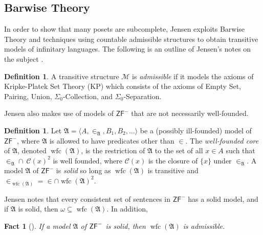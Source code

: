 \documentclass{amsart}
\newtheorem{fact}[theorem]{Fact}
\theoremstyle{definition}
\newtheorem{definition}[theorem]{Definition}
\theoremstyle{remark}
\newcommand{\M}{\mathcal{M}}
\DeclareMathOperator{\wfc}{wfc}
\begin{document}
\subsection{Barwise Theory}
\label{subsec:BarwiseTheory}
In order to show that many posets are subcomplete, Jensen exploits Barwise Theory and techniques using countable admissible structures to obtain transitive models of infinitary languages.  The following is an outline of Jensen's notes on the subject \cite[Ch.~1 \& 2]{Jensen:2014}. 

\begin{definition} A transitive structure $\M$ is \emph{admissible} if it models the axioms of \textsf{Kripke-Platek Set Theory} (\textsf{KP}) which consists of the axioms of \textsf{Empty Set}, \textsf{Pairing}, \textsf{Union}, $\Sigma_0$-\textsf{Collection}, and $\Sigma_0$-\textsf{Separation}. \end{definition}

Jensen also makes use of models of $\textsf{ZF}^-$ that are not necessarily well-founded.
\begin{definition} Let $\mathfrak A = \langle A, \in_{\mathfrak A}, B_1, B_2, \dots \rangle$ be a (possibly ill-founded) model  of $\textsf{ZF}^-$, where $\mathfrak A$ is allowed to have predicates other than $\in$. The \emph{well-founded core} of $\mathfrak A$, denoted $\wfc(\mathfrak A)$, is the restriction of $\mathfrak A$ to the set of all $x \in A$ such that $\in_{\mathfrak A} \cap \ \mathcal C(x)^2$ is well founded, where $\mathcal C(x)$ is the closure of $\{x\}$ under $\in_{\mathfrak A}$. A model $\mathfrak A$ of $\textsf{ZF}^-$ is \emph{solid} so long as $\wfc(\mathfrak A)$ is transitive and $\in_{\wfc(\mathfrak A)}=\in \cap \wfc(\mathfrak A)^2$. \end{definition}

Jensen \cite[Section 1.2]{Jensen:2014} notes that every consistent set of sentences in $\textsf{ZF}^-$ has a solid model, and if $\mathfrak A$ is solid, then $\omega \subseteq \wfc(\mathfrak A)$. In addition,

\begin{fact}[{\cite[Ch.~1 Lemma 21]{Jensen:2014}}] If a model $\mathfrak A$ of $\textsf{\textup{ZF}}^-$ is solid, then $\wfc(\mathfrak A)$ is admissible. \end{fact}
\end{document}
